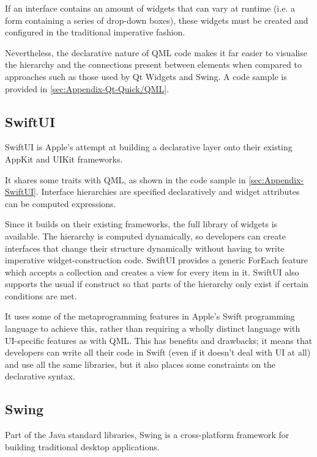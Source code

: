 \documentclass[11pt]{report}
\begin{document}
If an interface contains an amount of widgets that can vary at runtime (i.e. a form containing a series of drop-down boxes), these widgets must be created and configured in the traditional imperative fashion.

Nevertheless, the declarative nature of QML code makes it far easier to visualise the hierarchy and the connections present between elements when compared to approaches such as those used by Qt Widgets and Swing. A code sample is provided in \cref{sec:Appendix-Qt-Quick/QML}.

\subsection{SwiftUI} \label{secSwiftUI}

SwiftUI\cite{SwiftUI} is Apple's attempt at building a declarative layer onto their existing AppKit and UIKit frameworks.

It shares some traits with QML, as shown in the code sample in \cref{sec:Appendix-SwiftUI}. Interface hierarchies are specified declaratively and widget attributes can be computed expressions.

Since it builds on their existing frameworks, the full library of widgets is available. The hierarchy is computed dynamically, so developers can create interfaces that change their structure dynamically without having to write imperative widget-construction code. SwiftUI provides a generic ForEach feature\cite{SwiftForEach} which accepts a collection and creates a view for every item in it. SwiftUI also supports the usual if construct so that parts of the hierarchy only exist if certain conditions are met.

It uses some of the metaprogramming features in Apple's Swift programming language to achieve this, rather than requiring a wholly distinct language with UI-specific features as with QML. This has benefits and drawbacks; it means that developers can write all their code in Swift (even if it doesn't deal with UI at all) and use all the same libraries, but it also places some constraints on the declarative syntax.

\subsection{Swing} \label{secSwing}

Part of the Java standard libraries, Swing is a cross-platform framework for building traditional desktop applications.
\end{document}
